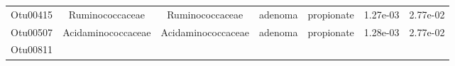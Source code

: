 \documentclass[11pt,]{article}
\begin{document}
\begin{longtable}[]{@{}ccccccc@{}}
\begin{minipage}[t]{0.09\columnwidth}\centering\strut
Otu00415\strut
\end{minipage} & \begin{minipage}[t]{0.17\columnwidth}\centering\strut
Ruminococcaceae\strut
\end{minipage} & \begin{minipage}[t]{0.17\columnwidth}\centering\strut
Ruminococcaceae\strut
\end{minipage} & \begin{minipage}[t]{0.09\columnwidth}\centering\strut
adenoma\strut
\end{minipage} & \begin{minipage}[t]{0.11\columnwidth}\centering\strut
propionate\strut
\end{minipage} & \begin{minipage}[t]{0.09\columnwidth}\centering\strut
1.27e-03\strut
\end{minipage} & \begin{minipage}[t]{0.09\columnwidth}\centering\strut
2.77e-02\strut
\end{minipage}\tabularnewline
\begin{minipage}[t]{0.09\columnwidth}\centering\strut
Otu00507\strut
\end{minipage} & \begin{minipage}[t]{0.17\columnwidth}\centering\strut
Acidaminococcaceae\strut
\end{minipage} & \begin{minipage}[t]{0.17\columnwidth}\centering\strut
Acidaminococcaceae\strut
\end{minipage} & \begin{minipage}[t]{0.09\columnwidth}\centering\strut
adenoma\strut
\end{minipage} & \begin{minipage}[t]{0.11\columnwidth}\centering\strut
propionate\strut
\end{minipage} & \begin{minipage}[t]{0.09\columnwidth}\centering\strut
1.28e-03\strut
\end{minipage} & \begin{minipage}[t]{0.09\columnwidth}\centering\strut
2.77e-02\strut
\end{minipage}\tabularnewline
\begin{minipage}[t]{0.09\columnwidth}\centering\strut
Otu00811\strut
\end{minipage} & \begin{minipage}[t]{0.17\columnwidth}\centering\strut

\end{minipage}
\end{longtable}
\end{document}
